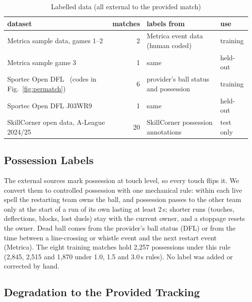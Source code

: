 \documentclass[conference]{IEEEtran}
\begin{document}
\begin{table}[t]
\caption{Labelled data (all external to the provided match)}
\label{tab:data}
\centering
\footnotesize
\begin{tabularx}{\columnwidth}{@{}>{\raggedright\arraybackslash}X r >{\raggedright\arraybackslash}p{24mm} l@{}}
\toprule
dataset & matches & labels from & use\\
\midrule
Metrica sample data, games 1--2 & 2 & Metrica event data (human coded) & training\\
Metrica sample game 3 & 1 & same & held-out\\
Sportec Open DFL~\cite{bassek2025dfl} (codes in Fig.~\ref{fig:permatch}) & 6 & provider's ball status and possession & training\\
Sportec Open DFL J03WR9 & 1 & same & held-out\\
SkillCorner open data, A-League 2024/25 & 20 & SkillCorner possession annotations & test only\\
\bottomrule
\end{tabularx}
\end{table}

\subsection{Possession Labels}

The external sources mark possession at touch level, so every touch flips it. We convert them to controlled
possession with one mechanical rule: within each live spell the restarting team owns the ball, and possession passes
to the other team only at the start of a run of its own lasting at least 2\,s; shorter runs (touches, deflections,
blocks, lost duels) stay with the current owner, and a stoppage resets the owner. Dead ball comes from the provider's
ball status (DFL) or from the time between a line-crossing or whistle event and the next restart event (Metrica).
The eight training matches hold 2{,}257 possessions under this rule (2{,}845, 2{,}515 and 1{,}870 under 1.0, 1.5 and
3.0\,s rules). No label was added or corrected by hand.

\subsection{Degradation to the Provided Tracking}
\label{sec:degradation}
\end{document}
